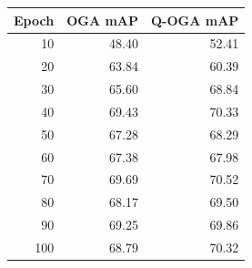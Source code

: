 \begin{tabular}{rrr}
\toprule
Epoch & OGA mAP & Q-OGA mAP \\
\midrule
10 & 48.40 & 52.41 \\
20 & 63.84 & 60.39 \\
30 & 65.60 & 68.84 \\
40 & 69.43 & 70.33 \\
50 & 67.28 & 68.29 \\
60 & 67.38 & 67.98 \\
70 & 69.69 & 70.52 \\
80 & 68.17 & 69.50 \\
90 & 69.25 & 69.86 \\
100 & 68.79 & 70.32 \\
\bottomrule
\end{tabular}
